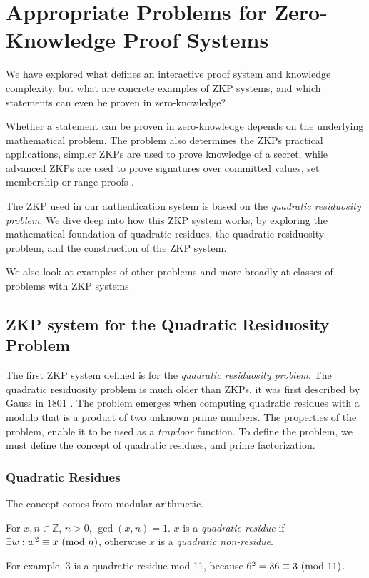 \section{Appropriate Problems for Zero-Knowledge \newline Proof Systems}
We have explored what defines an interactive proof system and knowledge complexity, but what are concrete examples of ZKP systems, and which statements can even be proven in zero-knowledge?

Whether a statement can be proven in zero-knowledge depends on the underlying mathematical problem.
The problem also determines the ZKPs practical applications, simpler ZKPs are used to prove knowledge of a secret, while advanced ZKPs are used to prove signatures over committed values, set membership or range proofs \cite{camenisch2008efficient, bunz2018bulletproofs, camenisch2001efficient, bowe2018multi}.

The ZKP \cite{goldwasser1989knowledge} used in our authentication system is based on the \textit{quadratic residuosity problem}.
We dive deep into how this ZKP system works, by exploring the mathematical foundation of quadratic residues, the quadratic residuosity problem, and the construction of the ZKP system.

We also look at examples of other problems and more broadly at classes of problems with ZKP systems

\subsection{ZKP system for the Quadratic Residuosity Problem}
\label{zkp-qrp}
The first ZKP system defined \cite{goldwasser1989knowledge} is for the \textit{quadratic residuosity problem}.
The quadratic residuosity problem is much older than ZKPs, it was first described by Gauss in 1801 \cite{gauss1801disquisitiones}.
The problem emerges when computing quadratic residues with a modulo that is a product of two unknown prime numbers.
The properties of the problem, enable it to be used as a \textit{trapdoor} function. 
To define the problem, we must define the concept of quadratic residues, and prime factorization.


\subsubsection{Quadratic Residues} 
The concept \cite{andrews1994number} comes from modular arithmetic.

\begin{definition}
	For $x, n \in \mathbb{Z}$, $n > 0$, $\gcd(x, n) = 1 $.
	$x$ is a \textit{quadratic residue} if  $\exists w:w^2 \equiv x \ (\mathrm{mod}\ n)$, otherwise $x$ is a \textit{quadratic non-residue}.
\end{definition}
\noindent For example,
$3$ is a quadratic residue mod 11, because $6^2 = 36 \equiv 3 \ (\mathrm{mod}\ 11)$.

